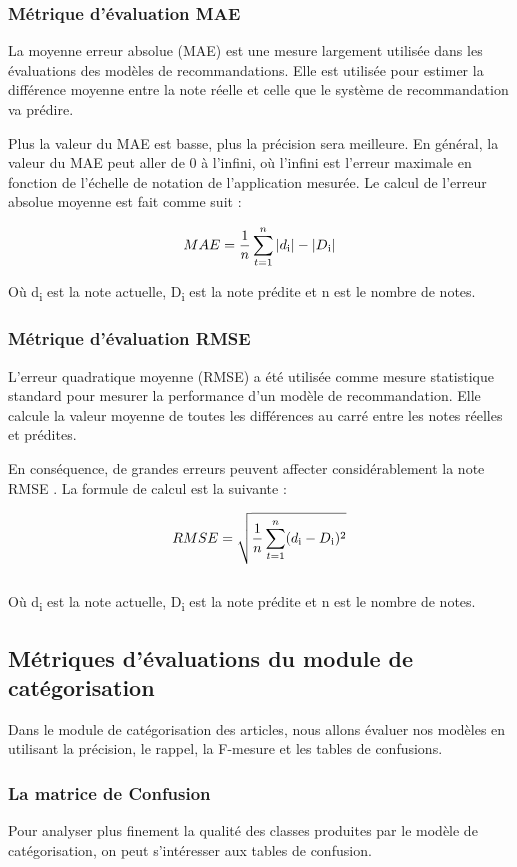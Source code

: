         \subsubsection{Métrique d'évaluation MAE}
        La moyenne erreur absolue (MAE) est une mesure largement utilisée dans les évaluations des modèles de recommandations. Elle est utilisée pour estimer la différence moyenne entre la note réelle et celle que le système de recommandation va prédire. 

        Plus la valeur du MAE est basse, plus la précision sera meilleure. En général, la valeur du MAE peut aller de 0 à l'infini, où l'infini est l'erreur maximale en fonction de l'échelle de notation de l'application mesurée. Le calcul de l'erreur absolue moyenne est fait comme suit \cite{rmse}:

        \[MAE = \frac{1}{n}\sum_{t=1}^{n}|d\textsubscript{i}|-|D\textsubscript{i}|\]

        Où d\textsubscript{i} est la note actuelle, D\textsubscript{i} est la note prédite et n est le nombre de notes.

        \subsubsection{Métrique d'évaluation RMSE}
        L'erreur quadratique moyenne (RMSE) a été utilisée comme mesure statistique standard pour mesurer la performance d'un modèle de recommandation. Elle  calcule la valeur moyenne de toutes les différences au carré entre les notes réelles et prédites. 

        En conséquence, de grandes erreurs peuvent affecter considérablement la note RMSE \cite{rmse}. La formule de calcul est la suivante :

        \[RMSE = \sqrt{\frac{1}{n}\sum_{t=1}^{n}(d\textsubscript{i} - D\textsubscript{i})^2}\] \\

        Où d\textsubscript{i} est la note actuelle, D\textsubscript{i} est la note prédite et n est le nombre de notes.

    \subsection{Métriques d'évaluations du module de catégorisation}
    Dans le module de catégorisation des articles, nous allons évaluer nos modèles en utilisant la précision, le rappel, la F-mesure et les tables de confusions.
        \subsubsection{La matrice de Confusion}
        Pour analyser plus finement la qualité des classes produites par le modèle de catégorisation, on peut s’intéresser aux tables de confusion. 
        
